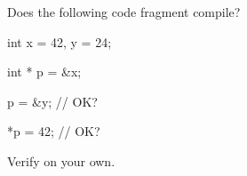 Does the following code fragment compile?



\begin{consolethree}[escapeinside=||]

int x = 42, y = 24;

int * p = &x;

p = &y;     // OK?

*p = 42;    // OK?

\end{consolethree}

Verify on your own.

